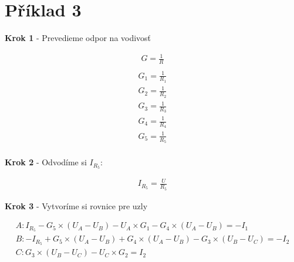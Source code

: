 \section{Příklad 3}

\begin{center}
    \textbf{Krok 1} - Prevedieme odpor na vodivosť
\end{center}
\begin{gather*}
    G = \frac{1}{R}\\
\end{gather*}
\bigbreak
\begin{gather*}
    G_1 = \frac{1}{R_1}\\
    G_2 = \frac{1}{R_2}\\
    G_3 = \frac{1}{R_3}\\
    G_4 = \frac{1}{R_4}\\
    G_5 = \frac{1}{R_5}\\
\end{gather*}

\begin{center}
    \textbf{Krok 2} - Odvodíme si $I_{R_{5}}$:
\end{center}
\begin{gather*}
I_{R_{5}} = \frac{U}{R_5}
\end{gather*}

\begin{center}
    \textbf{Krok 3} - Vytvoríme si rovnice pre uzly
\end{center}
\begin{gather*}
    A: I_{R_{5}} - G_{5} \times (U_{A} - U_{B}) - U_{A} \times G_{1} - G_{4} \times (U_{A} - U_{B}) = -I_{1}\\
    B: -I_{R_{5}} + G_{5} \times (U_{A} - U_{B}) + G_{4} \times (U_{A} - U_{B}) - G_{3} \times (U_{B} - U_{C}) = -I_{2}\\
    C: G_{3} \times (U_{B} - U_{C}) - U_{C} \times G_{2} = I_{2}\\
\end{gather*}

\newpage

